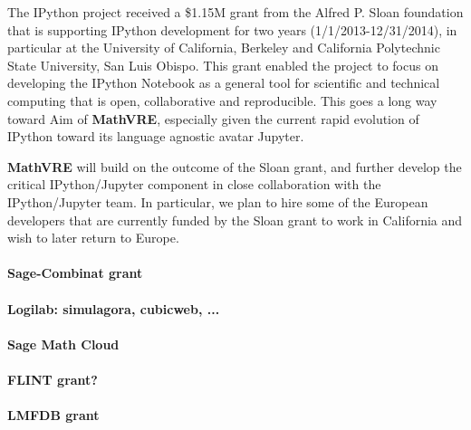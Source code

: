 \documentclass[a4paper,11pt]{article}
\newcommand{\XX}{\textbf{MathVRE}\xspace}
\newcommand{\TheProject}{\XX}
\begin{document}
The IPython project received a \$1.15M grant from the Alfred P. Sloan
foundation that is supporting IPython development for two years
(1/1/2013-12/31/2014), in particular at the University of California,
Berkeley and California Polytechnic State University, San Luis Obispo.
This grant enabled the project to focus on developing the IPython
Notebook as a general tool for scientific and technical computing that
is open, collaborative and reproducible. This goes a long way toward
Aim  of \TheProject, especially given the current
rapid evolution of IPython toward its language agnostic avatar
Jupyter.

\TheProject will build on the outcome of the Sloan grant, and further
develop the critical IPython/Jupyter component in close collaboration
with the IPython/Jupyter team. In particular, we plan to hire some of
the European developers that are currently funded by the Sloan grant
to work in California and wish to later return to Europe.

\paragraph{Sage-Combinat grant}

\paragraph{Logilab: simulagora, cubicweb, ...}


\paragraph{Sage Math Cloud}

\paragraph{FLINT grant?}

\paragraph{LMFDB grant}
\end{document}
